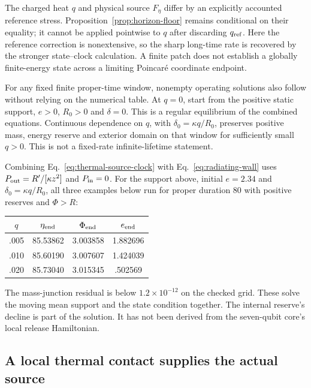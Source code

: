 \documentclass[12pt,a4paper]{article}
\begin{document}
The charged heat $q$ and physical source $F_\eta$ differ by an explicitly
accounted reference stress. Proposition~\ref{prop:horizon-floor} remains
conditional on their equality; it cannot be applied pointwise to $q$
after discarding $q_{\rm ref}$. Here the reference correction is
nonextensive, so the sharp long-time rate is recovered by the stronger
state--clock calculation. A finite patch does not establish a globally
finite-energy state across a limiting Poincar\'e coordinate endpoint.

For any fixed finite proper-time window, nonempty operating solutions
also follow without relying on the numerical table. At $q=0$, start
from the positive static support, $e>0$, $R_0>0$ and $\delta=0$.
This is a regular equilibrium of the combined equations. Continuous
dependence on $q$, with $\delta_0=\kappa q/R_0$, preserves positive
mass, energy reserve and exterior domain on that window for sufficiently
small $q>0$. This is not a fixed-rate infinite-lifetime statement.

Combining Eq.~\eqref{eq:thermal-source-clock} with
Eq.~\eqref{eq:radiating-wall} uses
$P_{\rm out}=R'/[\kappa z^2]$ and $P_{\rm in}=0$.
For the support above, initial $e=2.34$ and
$\delta_0=\kappa q/R_0$, all three examples below run for proper
duration 80 with positive reserves and $\Phi>R$:
\begin{center}
\begin{tabular}{cccc}
\hline
$q$ & $\eta_{\rm end}$ & $\Phi_{\rm end}$ & $e_{\rm end}$\\
\hline
.005 & 85.53862 & 3.003858 & 1.882696\\
.010 & 85.60190 & 3.007607 & 1.424039\\
.020 & 85.73040 & 3.015345 & .502569\\
\hline
\end{tabular}
\end{center}
The mass-junction residual is below $1.2\times10^{-12}$ on the checked
grid. These solve the moving mean support and the state condition together.
The internal reserve's decline is part of the solution. It has not been
derived from the seven-qubit core's local release Hamiltonian.

\subsection{A local thermal contact supplies the actual source}
\label{sec:local-source-contact}
\end{document}
